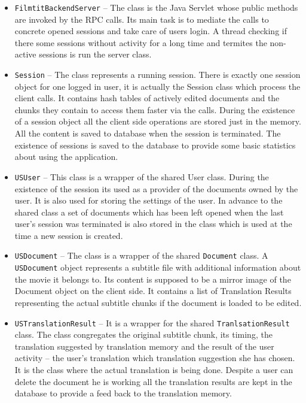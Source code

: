 \begin{itemize}
\item {\tt FilmtitBackendServer}  -- The class is the Java Servlet whose public methods are invoked by the RPC calls. Its main task is to mediate the calls to concrete opened sessions and take care of users login. A thread checking if there some sessions without activity for a long time and termites the non-active sessions is run the server class.

\item {\tt Session} -- The class represents a running session. There is exactly one session object for one logged in user, it is actually the Session class which process the client calls. It contains hash tables of actively edited documents and the chunks they contain to access them faster via the calls. During the existence of a session object all the client side operations are stored just in the memory. All the content is saved to database when the session is terminated. The existence of sessions is saved to the database to provide some basic statistics about using the application.

\item {\tt USUser} -- This class is a wrapper of the shared User class. During the existence of the session its used as a provider of the documents owned by the user. It is also used for storing the settings of the user. In advance to the shared class a set of documents which has been left opened when the last user's session was terminated is also stored in the class which is used at the time a new session is created. 

\item {\tt USDocument} -- The class is a wrapper of the shared {\tt Document} class. A {\tt USDocument} object represents a subtitle file with additional information about the movie it belongs to. Its content is supposed to be a mirror image of the Document object on the client side. It contains a list of Translation Results representing the actual subtitle chunks if the document is loaded to be edited.

\item {\tt USTranslationResult} -- It is a wrapper for the shared {\tt TranlsationResult} class. The class congregates the original subtitle chunk, its timing, the translation suggested by translation memory and the result of the user activity -- the user's translation which translation suggestion she has chosen. It is the class where the actual translation is being done. Despite a user can delete the document he is working all the translation results are kept in the database to provide a  feed back to the translation memory.


\end{itemize}
